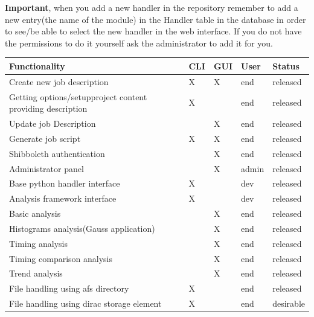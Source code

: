 \documentclass{lhcbnote}
\begin{document}
{\bf Important}, when you add a new handler in the repository remember to add a new entry(the name of the module) in the Handler table in the database
in order to see/be able to select the new handler in the web interface. If you do not have the permissions to do it yourself ask the administrator to add it for you.

\vspace {2 mm}


\bgroup
\def\arraystretch{1.5}%
    \begin{tabular}{| l | l | l | l | l|}
    \hline
    {\bf Functionality} & {\bf CLI} & {\bf GUI} & {\bf User} & {\bf Status} \\ \hline
    Create new job description & X & X & end & released \\ \hline    
	Getting options/setupproject content providing description & X & & end & released \\ \hline
	Update job Description & & X & end &released \\ \hline
	Generate job script & X & X & end & released \\ \hline
	Shibboleth authentication & & X & end & released \\ \hline
	Administrator panel & & X & admin & released \\ \hline
	Base python handler interface & X & & dev & released \\ \hline
	Analysis framework interface & X & & dev & released \\ \hline	
	Basic analysis & & X & end & released \\ \hline
	Histograms analysis(Gauss application) & & X & end & released \\ \hline
	Timing analysis & & X & end & released \\ \hline
	Timing comparison analysis & & X & end & released \\ \hline
	Trend analysis & & X & end & released \\ \hline
	File handling using afs directory & X & & end & released \\ \hline
	File handling using dirac storage element & X & & end & desirable \\ \hline
	\end{tabular}
\end{document}
